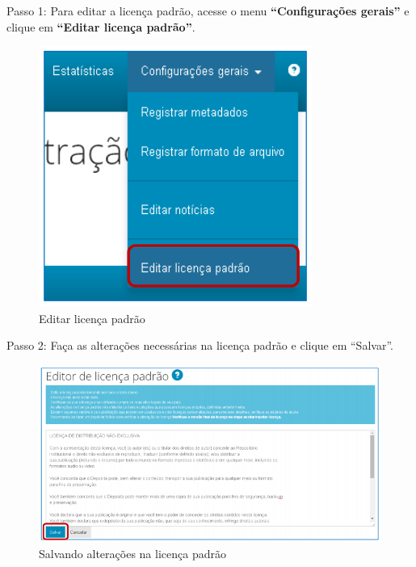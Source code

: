 \documentclass[12pt,hidelinks]{article}
\begin{document}
    \singlespacing
    
    Passo 1: Para editar a licença padrão, acesse o menu \textbf{“Configurações gerais”} e clique em \textbf{“Editar licença padrão”}. 
    
    \begin{figure}[!htp]
                \centering
                \includegraphics[scale=0.8]{figura/Figura132.png}
                \caption{Editar licença padrão}
            \label{Rotulo}
        \end{figure}
        
\newpage
    
    Passo 2: Faça as alterações necessárias na licença padrão e clique em “Salvar”.
    
    \begin{figure}[!htp]
                \centering
                \includegraphics[scale=0.8]{figura/Figura133.png}
                \caption{Salvando alterações na licença padrão}
            \label{Rotulo}
        \end{figure}
\end{document}
